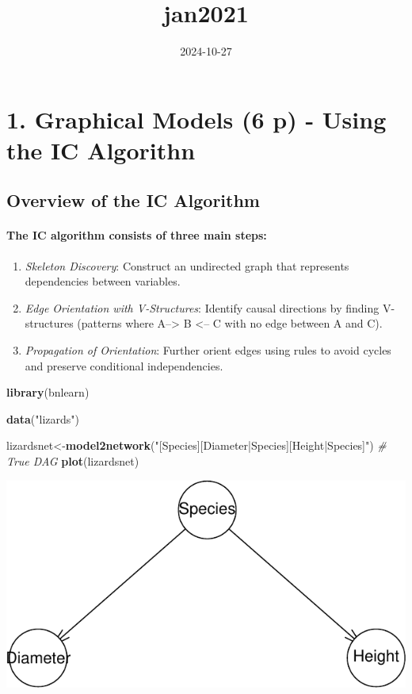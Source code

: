 \documentclass[
]{article}
\title{jan2021}
\author{}
\date{\vspace{-2.5em}2024-10-27}
\newenvironment{Shaded}{\begin{snugshade}}{\end{snugshade}}
\newcommand{\CommentTok}[1]{\textcolor[rgb]{0.56,0.35,0.01}{\textit{#1}}}
\newcommand{\FunctionTok}[1]{\textcolor[rgb]{0.13,0.29,0.53}{\textbf{#1}}}
\newcommand{\NormalTok}[1]{#1}
\newcommand{\OtherTok}[1]{\textcolor[rgb]{0.56,0.35,0.01}{#1}}
\newcommand{\StringTok}[1]{\textcolor[rgb]{0.31,0.60,0.02}{#1}}
\providecommand{\tightlist}{%
  \setlength{\itemsep}{0pt}\setlength{\parskip}{0pt}}
\begin{document}
\maketitle

\section{1. Graphical Models (6 p) - Using the IC
Algorithn}\label{graphical-models-6-p---using-the-ic-algorithn}

\subsection{Overview of the IC
Algorithm}\label{overview-of-the-ic-algorithm}

\paragraph{The IC algorithm consists of three main
steps:}\label{the-ic-algorithm-consists-of-three-main-steps}

\begin{enumerate}
\def\labelenumi{\arabic{enumi}.}
\tightlist
\item
  \emph{Skeleton Discovery}: Construct an undirected graph that
  represents dependencies between variables.
\item
  \emph{Edge Orientation with V-Structures}: Identify causal directions
  by finding V-structures (patterns where A--\textgreater{} B
  \textless-- C with no edge between A and C).
\item
  \emph{Propagation of Orientation}: Further orient edges using rules to
  avoid cycles and preserve conditional independencies.
\end{enumerate}

\begin{Shaded}
\begin{Highlighting}[]
\FunctionTok{library}\NormalTok{(bnlearn)}

\FunctionTok{data}\NormalTok{(}\StringTok{"lizards"}\NormalTok{)}

\NormalTok{lizardsnet}\OtherTok{\textless{}{-}}\FunctionTok{model2network}\NormalTok{(}\StringTok{"[Species][Diameter|Species][Height|Species]"}\NormalTok{) }\CommentTok{\# True DAG}
\FunctionTok{plot}\NormalTok{(lizardsnet)}
\end{Highlighting}
\end{Shaded}

\includegraphics{jan2021_files/figure-latex/unnamed-chunk-1-1.pdf}
\end{document}
